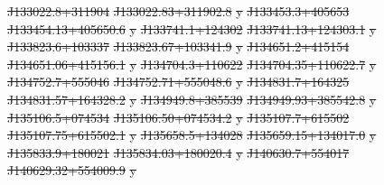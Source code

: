 \documentclass[11pt, a4paper]{book}
\providecommand{\DIFdeltex}[1]{{\protect\color{red}\sout{#1}}}                      %
\providecommand{\DIFdelFL}[1]{\DIFdel{#1}} %
\providecommand{\DIFdel}[1]{\texorpdfstring{\DIFdeltex{#1}}{}} %
\begin{document}
\DIFdelFL{J133022.8+311904 }%
\DIFdelFL{J133022.83+311902.8 }%
\DIFdelFL{y}%
\DIFdelFL{J133453.3+405653 }%
\DIFdelFL{J133454.13+405650.6 }%
\DIFdelFL{y}%
\DIFdelFL{J133741.1+124302 }%
\DIFdelFL{J133741.13+124303.1 }%
\DIFdelFL{y}%
\DIFdelFL{J133823.6+103337 }%
\DIFdelFL{J133823.67+103341.9 }%
\DIFdelFL{y}%
\DIFdelFL{J134651.2+415154 }%
\DIFdelFL{J134651.06+415156.1 }%
\DIFdelFL{y}%
\DIFdelFL{J134704.3+110622 }%
\DIFdelFL{J134704.35+110622.7 }%
\DIFdelFL{y}%
\DIFdelFL{J134752.7+555046 }%
\DIFdelFL{J134752.71+555048.6 }%
\DIFdelFL{y}%
\DIFdelFL{J134831.7+164325 }%
\DIFdelFL{J134831.57+164328.2 }%
\DIFdelFL{y}%
\DIFdelFL{J134949.8+385539 }%
\DIFdelFL{J134949.93+385542.8 }%
\DIFdelFL{y}%
\DIFdelFL{J135106.5+074534 }%
\DIFdelFL{J135106.50+074534.2 }%
\DIFdelFL{y}%
\DIFdelFL{J135107.7+615502 }%
\DIFdelFL{J135107.75+615502.1 }%
\DIFdelFL{y}%
\DIFdelFL{J135658.5+134028 }%
\DIFdelFL{J135659.15+134017.0 }%
\DIFdelFL{y}%
\DIFdelFL{J135833.9+180021 }%
\DIFdelFL{J135834.03+180020.4 }%
\DIFdelFL{y}%
\DIFdelFL{J140630.7+554017 }%
\DIFdelFL{J140629.32+554009.9 }%
\DIFdelFL{y}%
\end{document}
